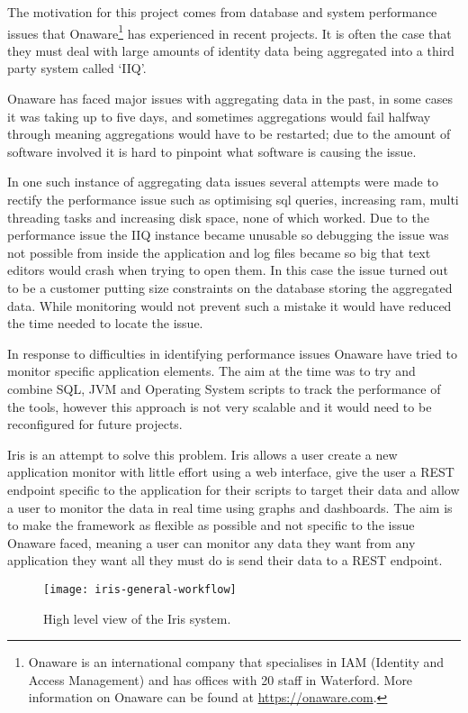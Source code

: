 \documentclass[12pt,a4paper,titlepage]{report}
\begin{document}
The motivation for this project comes from database and system performance issues that Onaware\footnote{Onaware is an international company that specialises in IAM (Identity and Access Management) and has offices with 20 staff in Waterford. More information on Onaware can be found at \url{https://onaware.com}.} has experienced in recent projects. It is often the case that they must deal with large amounts of identity data being aggregated into a third party system called `IIQ'.

Onaware has faced major issues with aggregating data in the past, in some cases it was taking up to five days, and sometimes aggregations would fail halfway through meaning aggregations would have to be restarted; due to the amount of software involved it is hard to pinpoint what software is causing the issue.

In one such instance of aggregating data issues several attempts were made to rectify the performance issue such as optimising sql queries, increasing ram, multi threading tasks and increasing disk space, none of which worked. Due to the performance issue the IIQ instance became unusable so debugging the issue was not possible from inside the application and log files became so big that text editors would crash when trying to open them. In this case the issue turned out to be a customer putting size constraints on the database storing the aggregated data. While monitoring would not prevent such a mistake it would have reduced the time needed to locate the issue.

In response to difficulties in identifying performance issues Onaware have tried to monitor specific application elements. The aim at the time was to try and combine SQL, JVM and Operating System scripts to track the performance of the tools, however this approach is not very scalable and it would need to be reconfigured for future projects.

Iris is an attempt to solve this problem. Iris allows a user create a new application monitor with little effort using a web interface, give the user a REST endpoint specific to the application for their scripts to target their data and allow a user to monitor the data in real time using graphs and dashboards. The aim is to make the framework as flexible as possible and not specific to the issue Onaware faced, meaning a user can monitor any data they want from any application they want all they must do is send their data to a REST endpoint.

\begin{figure}[H]
\begin{tcolorbox}
\begin{center}
\texttt{[image: iris-general-workflow]}
\end{center}
\end{tcolorbox}
\caption{High level view of the Iris system.}
\end{figure}
\end{document}
